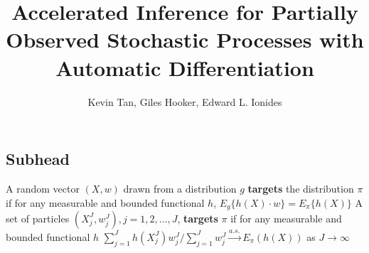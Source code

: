\documentclass[9pt,twoside,lineno]{pnas-new}
\begin{document}
\title{Accelerated Inference for Partially Observed Stochastic Processes with Automatic Differentiation}
\author{Kevin Tan, Giles Hooker, Edward L. Ionides}


\maketitle




\SItext


\subsection*{Subhead}


\begin{defn}[Targeting]
    \label{defn:targeting}
    A random vector $(X, w)$ drawn from a distribution $g$ \textbf{targets} the distribution $\pi$ if for any measurable and bounded functional $h$, $E_g\{h(X) \cdot w\}=E_\pi\{h(X)\}$ 
    A set of particles $(X^J_j, w^J_j), j=1,2, \ldots,J$, \textbf{targets} $\pi$ if for any measurable and bounded functional $h$
    ${\sum_{j=1}^J h(X^J_j) w^J_j}/{\sum_{j=1}^J w^J_j} \stackrel{a.s.}{\to} E_\pi(h(X))$ as $J\to\infty$
\end{defn}
\end{document}

